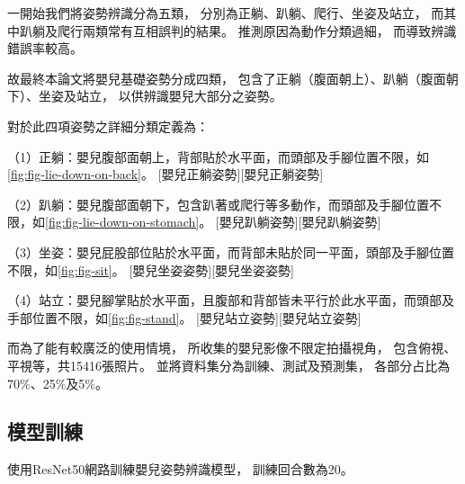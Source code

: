 \documentclass[class=NCU_thesis, crop=false]{standalone}
\begin{document}
一開始我們將姿勢辨識分為五類，
分別為正躺、趴躺、爬行、坐姿及站立，
而其中趴躺及爬行兩類常有互相誤判的結果。
推測原因為動作分類過細，
而導致辨識錯誤率較高。

故最終本論文將嬰兒基礎姿勢分成四類，
包含了正躺（腹面朝上）、趴躺（腹面朝下）、坐姿及站立，
以供辨識嬰兒大部分之姿勢。

對於此四項姿勢之詳細分類定義為：

（1）正躺：嬰兒腹部面朝上，背部貼於水平面，而頭部及手腳位置不限，如\cref{fig:fig-lie-down-on-back}。
[嬰兒正躺姿勢][嬰兒正躺姿勢]

（2）趴躺：嬰兒腹部面朝下，包含趴著或爬行等多動作，而頭部及手腳位置不限，如\cref{fig:fig-lie-down-on-stomach}。
[嬰兒趴躺姿勢][嬰兒趴躺姿勢]

（3）坐姿：嬰兒屁股部位貼於水平面，而背部未貼於同一平面，頭部及手腳位置不限，如\cref{fig:fig-sit}。
[嬰兒坐姿姿勢][嬰兒坐姿姿勢]

（4）站立：嬰兒腳掌貼於水平面，且腹部和背部皆未平行於此水平面，而頭部及手部位置不限，如\cref{fig:fig-stand}。
[嬰兒站立姿勢][嬰兒站立姿勢]

而為了能有較廣泛的使用情境，
所收集的嬰兒影像不限定拍攝視角，
包含俯視、平視等，共15416張照片。
並將資料集分為訓練、測試及預測集，
各部分占比為70\%、25\%及5\%。

\subsection{模型訓練}
使用ResNet50網路訓練嬰兒姿勢辨識模型，
訓練回合數為20。
\end{document}
